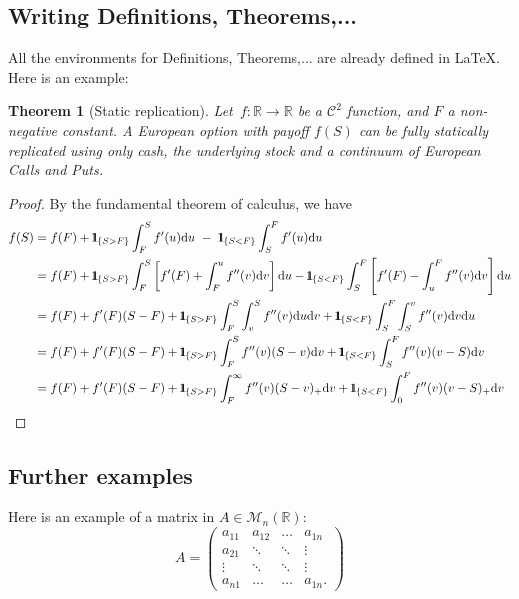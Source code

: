 \documentclass[a4paper, twoside]{report}
\newtheorem{theorem}{Theorem}[section]
\theoremstyle{definition}
\newcommand{\ind}{1\hspace{-2.1mm}{1}} %
\newcommand{\D}{\mathrm{d}}
\newcommand{\RR}{\mathbb{R}}
\numberwithin{equation}{section}
\begin{document}
\subsection{Writing Definitions, Theorems,...}
All the environments for Definitions, Theorems,... are already defined in \LaTeX.
Here is an example:
\begin{theorem}[Static replication]\label{thm:StaticReplication}
  Let~$f:\RR\to\RR$ be a $\mathcal{C}^2$ function, and $F$ a non-negative constant.
  A European option with payoff $f(S)$ can be fully statically replicated using only cash,
  the underlying stock and a continuum of European Calls and Puts.
\end{theorem}
\begin{proof}
  By the fundamental theorem of calculus, we have
  \begin{align*}
    f(S) & = f(F) + \ind_{\{S>F\}}\int_F^S f'(u)\D u  \ - \  \ind_{\{S<F\}}\int_S^F f'(u)\D u                                       \\
         & = f(F) + \ind_{\{S>F\}}\int_F^S\left[f'(F) + \int_F^u f''(v)\D v\right]\D u
    - \ind_{\{S<F\}}\int_S^F \left[f'(F) - \int_u^F f''(v) \D v\right]\D u                                                          \\
         & = f(F) + f'(F) (S-F) + \ind_{\{S>F\}}\int_F^S \int_v^S f''(v)\D u \D v  + \ind_{\{S<F\}}\int_S^F \int_S^v f''(v)\D v\D u \\
         & = f(F) + f'(F) (S-F) + \ind_{\{S>F\}}\int_F^S f''(v)(S-v) \D v  + \ind_{\{S<F\}}\int_S^F f''(v) (v-S)\D v                \\
         & = f(F) + f'(F) (S-F) + \ind_{\{S>F\}}\int_F^\infty f''(v)(S-v)_+ \D v  + \ind_{\{S<F\}}\int_0^F f''(v) (v-S)_+ \D v
  \end{align*}
\end{proof}



\subsection{Further examples}
Here is an example of a matrix in $A\in\mathcal{M}_n(\RR)$:
$$
  A =
  \begin{pmatrix}
    a_{11} & a_{12} & \ldots & a_{1n}  \\
    a_{21} & \ddots & \ddots & \vdots  \\
    \vdots & \ddots & \ddots & \vdots  \\
    a_{n1} & \ldots & \ldots & a_{1n}.
  \end{pmatrix}
$$
\end{document}
